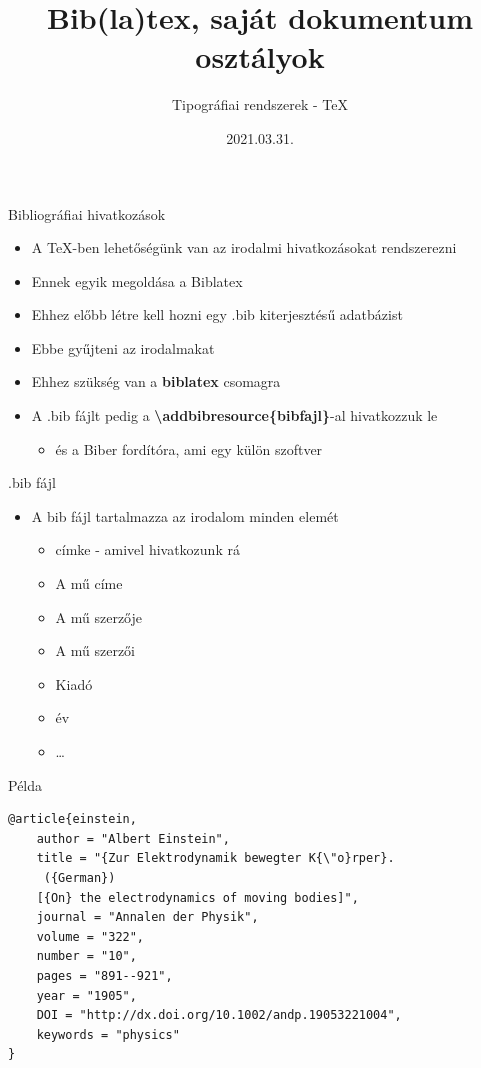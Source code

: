 \documentclass[11pt]{beamer}
\author{Tipográfiai rendszerek - \TeX
}
\title{Bib(la)tex, saját dokumentum osztályok}
\date{2021.03.31.}
\newcommand{\tbs}{\textbackslash}
\begin{document}
\begin{frame}
\titlepage
\end{frame}


\begin{frame}{Bibliográfiai hivatkozások}
\begin{itemize}
\item A \TeX{}-ben lehetőségünk van az irodalmi hivatkozásokat rendszerezni
\item Ennek egyik megoldása a Biblatex
\item Ehhez előbb létre kell hozni egy .bib kiterjesztésű adatbázist
\item Ebbe gyűjteni az irodalmakat
\item Ehhez szükség van a \textbf{biblatex} csomagra
\item A .bib fájlt pedig a \textbf{\tbs addbibresource\{bibfajl\}}-al hivatkozzuk le
	\begin{itemize}
	\item és a Biber fordítóra, ami egy külön szoftver
	\end{itemize}
\end{itemize}
\end{frame}

\begin{frame}{.bib fájl}
\begin{itemize}
\item A bib fájl tartalmazza az irodalom minden elemét
	\begin{itemize}
	\item címke - amivel hivatkozunk rá
	\item A mű címe
	\item A mű szerzője
	\item A mű szerzői
	\item Kiadó
	\item év
	\item \dots
	\end{itemize}
\end{itemize}
\end{frame}

\begin{frame}[fragile]{Példa}
\begin{verbatim}
@article{einstein,
    author = "Albert Einstein",
    title = "{Zur Elektrodynamik bewegter K{\"o}rper}.
     ({German})
    [{On} the electrodynamics of moving bodies]",
    journal = "Annalen der Physik",
    volume = "322",
    number = "10",
    pages = "891--921",
    year = "1905",
    DOI = "http://dx.doi.org/10.1002/andp.19053221004",
    keywords = "physics"
}
\end{verbatim}
\end{frame}
\end{document}
